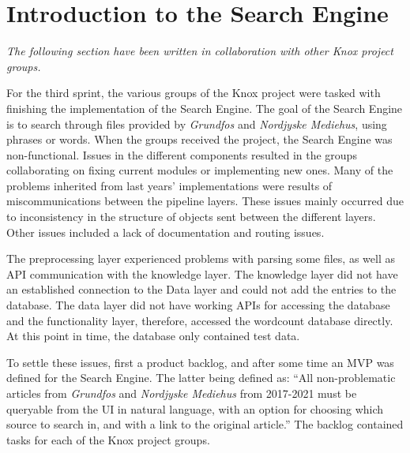 \section{Introduction to the Search Engine}\label{SHARED-search-engine}
\textit{The following section have been written in collaboration with other Knox project groups.}

For the third sprint, the various groups of the Knox project were tasked with finishing the implementation of the Search Engine. The goal of the Search Engine is to search through files provided by \textit{Grundfos} and \textit{Nordjyske Mediehus}, using phrases or words. When the groups received the project, the Search Engine was non-functional. Issues in the different components resulted in the groups collaborating on fixing current modules or implementing new ones. Many of the problems inherited from last years' implementations were results of miscommunications between the pipeline layers. These issues mainly occurred due to inconsistency in the structure of objects sent between the different layers. Other issues included a lack of documentation and routing issues. 

The preprocessing layer experienced problems with parsing some files, as well as API communication with the knowledge layer. The knowledge layer did not have an established connection to the Data layer and could not  add the entries to the database. The data layer did not have working APIs for accessing the database and the functionality layer, therefore, accessed the wordcount database directly. At this point in time, the database only contained test data.

To settle these issues, first a product backlog, and after some time an MVP was defined for the Search Engine. The latter being defined as: “All non-problematic articles from \textit{Grundfos} and \textit{Nordjyske Mediehus} from 2017-2021 must be queryable from the UI in natural language, with an option for choosing which source to search in, and with a link to the original article.” 
The backlog contained tasks for each of the Knox project groups.